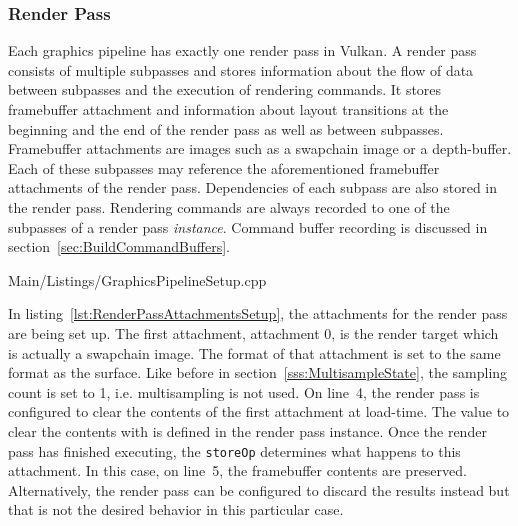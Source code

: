      \subsubsection{Render Pass}
        \label{sss:RenderPassSetup}
        Each graphics pipeline has exactly one render pass in Vulkan.
        A render pass consists of multiple subpasses and stores information about the flow of data between subpasses and the execution of rendering commands.
        It stores framebuffer attachment and information about layout transitions at the beginning and the end of the render pass as well as between subpasses.
        Framebuffer attachments are images such as a swapchain image or a depth-buffer.
        Each of these subpasses may reference the aforementioned framebuffer attachments of the render pass.
        Dependencies of each subpass are also stored in the render pass.
        Rendering commands are always recorded to one of the subpasses of a render pass \textit{instance}.
        Command buffer recording is discussed in section~\ref{sec:BuildCommandBuffers}.


        
        {Main/Listings/GraphicsPipelineSetup.cpp}

        In listing~\ref{lst:RenderPassAttachmentsSetup}, the attachments for the render pass are being set up.
        The first attachment, attachment 0, is the render target which is actually a swapchain image.
        The format of that attachment is set to the same format as the surface.
        Like before in section~\ref{sss:MultisampleState}, the sampling count is set to 1, i.e. multisampling is not used.
        On line~4, the render pass is configured to clear the contents of the first attachment at load-time.
        The value to clear the contents with is defined in the render pass instance.
        Once the render pass has finished executing, the \lstinline{storeOp} determines what happens to this attachment.
        In this case, on line~5, the framebuffer contents are preserved.
        Alternatively, the render pass can be configured to discard the results instead but that is not the desired behavior in this particular case.

